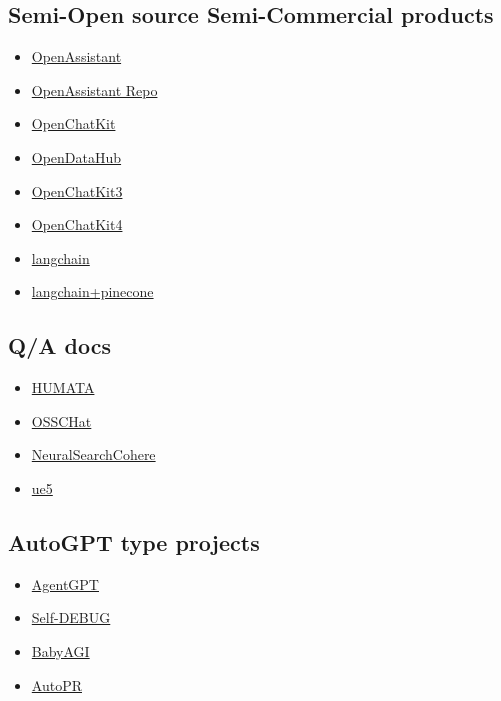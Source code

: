 \documentclass{article}
\begin{document}
\subsection*{Semi-Open source Semi-Commercial products}
\begin{itemize}
    \item \href{https://open-assistant.io/}{OpenAssistant}
    \item \href{https://github.com/LAION-AI/Open-Assistant}{OpenAssistant Repo}
    \item \href{https://github.com/togethercomputer/OpenChatKit}{OpenChatKit}
    \item \href{https://github.com/togethercomputer/OpenDataHub}{OpenDataHub}
    \item \href{https://www.together.xyz/blog/openchatkit}{OpenChatKit3}
    \item \href{https://github.com/togethercomputer/OpenChatKit/blob/main/training/README.md#arguments}{OpenChatKit4}
    \item \href{https://python.langchain.com/en/latest/}{langchain}
    \item \href{https://www.youtube.com/watch?v=nMniwlGyX-c}{langchain+pinecone}
\end{itemize}

\subsection*{Q/A docs}
\begin{itemize}
    \item \href{https://www.humata.ai/}{HUMATA}
    \item \href{https://osschat.io/}{OSSCHat}
    \item \href{https://txt.cohere.com/embedding-archives-wikipedia/}{NeuralSearchCohere}
    \item \href{https://github.com/bublint/ue5-llama-lora}{ue5}
\end{itemize}

\subsection*{AutoGPT type projects}
\begin{itemize}
    \item \href{https://github.com/reworkd/AgentGPT}{AgentGPT}
    \item \href{https://arxiv.org/abs/2304.05128}{Self-DEBUG}
    \item \href{https://github.com/yoheinakajima/babyagi/}{BabyAGI}
    \item \href{https://github.com/irgolic/AutoPR}{AutoPR}
\end{itemize}
\end{document}
